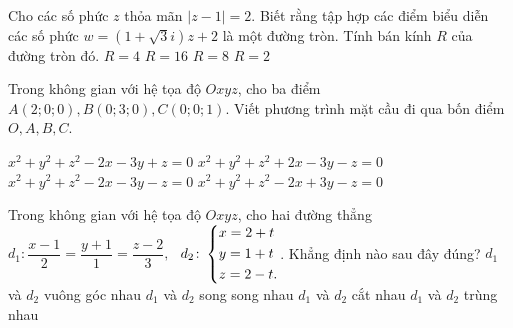 \begin{ex}%
	Cho các số phức $z$ thỏa mãn $\left|z-1\right|=2$. Biết rằng tập hợp các điểm biểu diễn các số phức $w=\left(1+\sqrt{3}i\right)z+2$ là một đường tròn. Tính bán kính $R$ của đường tròn đó.
	\choice
	{\True $R=4$}  
	{$R=16$}  
	{$R=8$}  
	{$R=2$}
\end{ex}

\begin{ex}%
	Trong không gian với hệ tọa độ $Oxyz$, cho ba  điểm  $A(2;0;0), B(0;3;0) , C(0;0;1)$. 	Viết phương trình mặt cầu đi qua bốn điểm $O, A, B, C$.  
	
	\choice
	{$x^2+y^2+z^2-2x-3y+z=0$}  
	{ $x^2+y^2+z^2+2x-3y-z=0$}  
	{\True $x^2+y^2+z^2-2x-3y-z=0$}  
	{$x^2+y^2+z^2-2x+3y-z=0$}
\end{ex}


\begin{ex}%
	Trong không gian với hệ tọa độ $Oxyz$,	cho hai đường thẳng $d_{1} \colon \dfrac{x-1}{2}=\dfrac{y+1}{1}=\dfrac{z-2}{3}, $\,\,  $d_{2} \colon
	\left\{\begin{aligned}
		& x=2+t \\ 
		& y=1+t \\ 
		& z=2-t.
	\end{aligned}\right.$. Khẳng định nào sau đây đúng?
	\choice
	{\True $d_1$ và $d_2$ vuông góc nhau}  
	{$d_1$ và $d_2$ song song nhau}  
	{$d_1$ và $d_2$ cắt nhau}  
	{$d_1$ và $d_2$ trùng nhau}
\end{ex}


